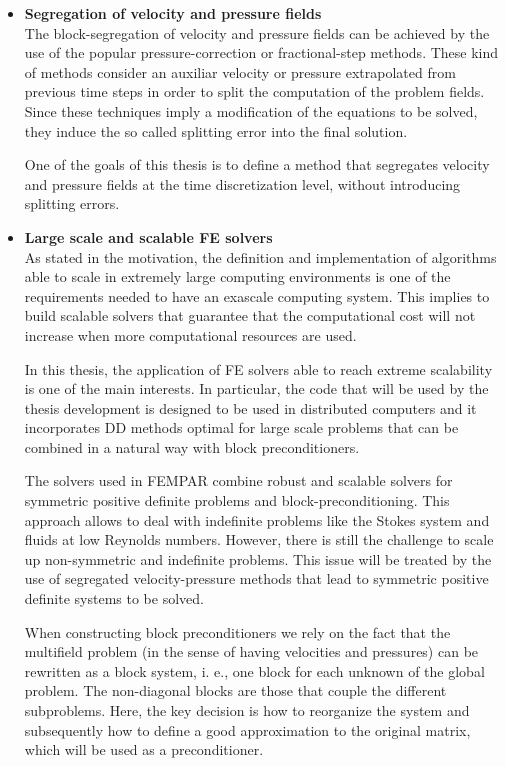 \begin{itemize}
\item {\bf Segregation of velocity and pressure fields}\\
The block-segregation of velocity and pressure fields can be achieved by the use of the popular pressure-correction or fractional-step methods. These kind of methods consider an auxiliar velocity or pressure extrapolated from previous time steps in order to split the computation of the problem fields. Since these techniques imply a modification of the equations to be solved, they induce the so called splitting error into the final solution.

One of the goals of this thesis is to define a method that segregates velocity and pressure fields at the time discretization level, without introducing splitting errors.

\item {\bf Large scale and scalable FE solvers}\\
As stated in the motivation, the definition and implementation of algorithms able to scale in extremely large computing environments is one of the requirements needed to have an exascale computing system. This implies to build scalable solvers that guarantee that the computational cost will not increase when more computational resources are used.

In this thesis, the application of FE solvers able to reach extreme scalability is one of the main interests. In particular, the code that will be used by the thesis development is designed to be used in distributed computers and it incorporates DD methods optimal for large scale problems that can be combined in a natural way with block preconditioners.

The solvers used in FEMPAR combine robust and scalable solvers for symmetric positive definite problems and block-preconditioning. This approach allows to deal with indefinite problems like the Stokes system and fluids at low Reynolds numbers. However, there is still the challenge to scale up non-symmetric and indefinite problems. This issue will be treated by the use of segregated velocity-pressure methods that lead to symmetric positive definite systems to be solved.

When constructing block preconditioners we rely on the fact that the multifield problem (in the sense of having velocities and pressures) can be rewritten as a block system, i. e., one block for each unknown of the global problem. The non-diagonal blocks are those that couple the different subproblems. Here, the key decision is how to reorganize the system and subsequently how to define a good approximation to the original matrix, which will be used as a preconditioner.


\end{itemize}
